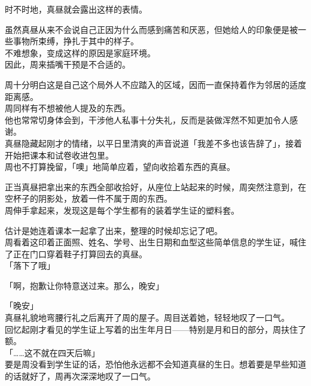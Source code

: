 时不时地，真昼就会露出这样的表情。

虽然真昼从来不会说自己正因为什么而感到痛苦和厌恶，但她给人的印象便是被一些事物所束缚，挣扎于其中的样子。\\

不难想象，变成这样的原因是家庭环境。\\

因此，周来插嘴干预是不合适的。

周十分明白这是自己这个局外人不应踏入的区域，因而一直保持着作为邻居的适度距离感。\\

周同样有不想被他人提及的东西。\\

他也常常切身体会到，干涉他人私事十分失礼，反而是装做浑然不知更加令人感谢。\\

真昼隐藏起刚才的情绪，以平日里清爽的声音说道「我差不多也该告辞了」，接着开始把课本和试卷收进包里。\\

周也不打算挽留，「噢」地简单应着，望向收拾着东西的真昼。

正当真昼把拿出来的东西全部收拾好，从座位上站起来的时候，周突然注意到，在空杯子的阴影处，放着一件不属于周的东西。\\

周伸手拿起来，发现这是每个学生都有的装着学生证的塑料套。

估计是她连着课本一起拿了出来，整理的时候却忘记了吧。\\

周看着这印着正面照、姓名、学号、出生日期和血型这些简单信息的学生证，喊住了正在门口穿着鞋子打算回去的真昼。\\

「落下了哦」

「啊，抱歉让你特意送过来。那么，晚安」

「晚安」\\

真昼礼貌地弯腰行礼之后离开了周的屋子。周目送着她，轻轻地叹了一口气。\\

回忆起刚才看见的学生证上写着的出生年月日——特别是月和日的部分，周扶住了额。\\

「……这不就在四天后嘛」\\

要是周没看到学生证的话，恐怕他永远都不会知道真昼的生日。想着要是早些知道的话就好了，周再次深深地叹了一口气。
